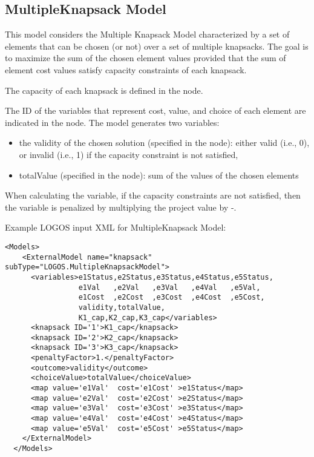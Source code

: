 \subsection{MultipleKnapsack Model}
\label{subsec:MultipleKnapsackModel}
This model considers the Multiple Knapsack Model characterized by a set of elements 
that can be chosen (or not) over a set of multiple knapsacks.
The goal is to maximize the sum of the chosen element values provided that the sum of 
element cost values satisfy capacity constraints of each knapsack.

The capacity of each knapsack is defined in the  node.

The ID of the variables that represent cost, value, and choice of each element are 
indicated in the  node.
The model generates two variables:
\begin{itemize}
  \item the validity of the chosen solution (specified in the  node): either 
        valid (i.e., 0), or invalid (i.e., 1) if the capacity constraint is not satisfied,
  \item totalValue (specified in the  node): sum of the values of the 
        chosen elements
\end{itemize}

When calculating the  variable, if the capacity constraints 
are not satisfied, then the  variable is penalized by multiplying the 
project value by -.

Example LOGOS input XML for MultipleKnapsack Model:
\begin{lstlisting}[style=XML]
  <Models>
    <ExternalModel name="knapsack" subType="LOGOS.MultipleKnapsackModel">
      <variables>e1Status,e2Status,e3Status,e4Status,e5Status,
                 e1Val   ,e2Val   ,e3Val   ,e4Val   ,e5Val,
                 e1Cost  ,e2Cost  ,e3Cost  ,e4Cost  ,e5Cost,
                 validity,totalValue,
                 K1_cap,K2_cap,K3_cap</variables>
      <knapsack ID='1'>K1_cap</knapsack>
      <knapsack ID='2'>K2_cap</knapsack>
      <knapsack ID='3'>K3_cap</knapsack>
      <penaltyFactor>1.</penaltyFactor>
      <outcome>validity</outcome>
      <choiceValue>totalValue</choiceValue>
      <map value='e1Val'  cost='e1Cost' >e1Status</map>
      <map value='e2Val'  cost='e2Cost' >e2Status</map>
      <map value='e3Val'  cost='e3Cost' >e3Status</map>
      <map value='e4Val'  cost='e4Cost' >e4Status</map>
      <map value='e5Val'  cost='e5Cost' >e5Status</map>
    </ExternalModel>
  </Models>
\end{lstlisting}
